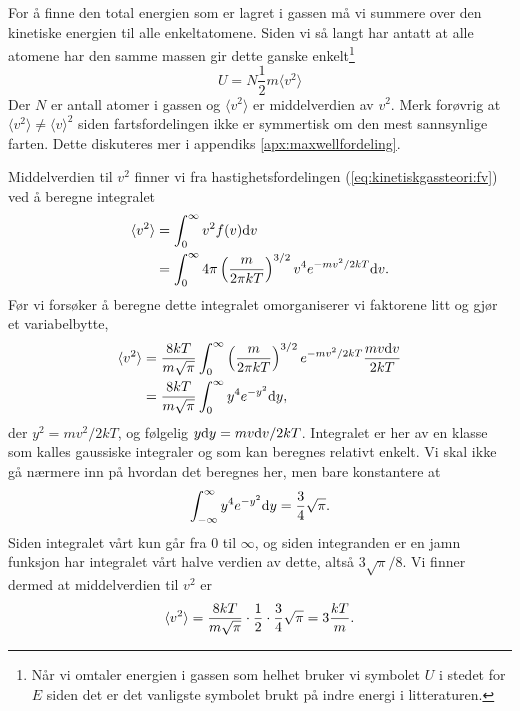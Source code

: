 For å finne den total energien som er lagret i gassen må vi summere over den kinetiske energien til alle enkeltatomene. Siden vi så langt har antatt at alle atomene har den samme massen gir dette ganske enkelt\footnote{Når vi omtaler energien i gassen som helhet bruker vi symbolet $U$ i stedet for $E$ siden det er det vanligste symbolet brukt på indre energi i litteraturen.}
\begin{displaymath}
	U = N\frac{1}{2}m\langle v^2 \rangle
\end{displaymath}
Der $N$ er antall atomer i gassen og $\langle v^2 \rangle$ er middelverdien av $v^2$. Merk forøvrig at $\langle v^2 \rangle \neq \langle v \rangle^2$ siden fartsfordelingen ikke er symmertisk om den mest sannsynlige farten. Dette diskuteres mer i appendiks \ref{apx:maxwellfordeling}.

Middelverdien til $v^2$ finner vi fra hastighetsfordelingen (\ref{eq:kinetiskgassteori:fv}) ved å beregne integralet
\begin{displaymath}
\begin{aligned}
	\langle v^2 \rangle &= \int_0^\infty v^2 f(v) \text{d} v \\
	&= \int_0^\infty 4\pi\left(\frac{m}{2\pi kT}\right)^{3/2} v^4 e^{-mv^2/2kT}\text{d} v.
\end{aligned}
\end{displaymath}
Før vi forsøker å beregne dette integralet omorganiserer vi faktorene litt og gjør et variabelbytte,
\begin{displaymath}
\begin{aligned}
	\langle v^2 \rangle &= \frac{8kT}{m\sqrt{\pi}} \int_0^\infty \left(\frac{m}{2\pi kT}\right)^{3/2}  e^{-mv^2/2kT}\frac{mv\text{d} v}{2kT} \\
	&=  \frac{8kT}{m\sqrt{\pi}} \int_0^\infty y^4 e^{-y^2} \text{d} y,
\end{aligned}
\end{displaymath}
der $y^2 = mv^2/2kT$, og følgelig $y\text{d} y = mv\text{d} v/2kT$. Integralet er her av en klasse som kalles gaussiske integraler og som kan beregnes relativt enkelt. Vi skal ikke gå nærmere inn på hvordan det beregnes her, men bare konstantere at
\begin{displaymath}
	\int_{-\infty}^\infty y^4e^{-y^2} \text{d} y = \frac{3}{4}\sqrt{\pi}.
\end{displaymath}
Siden integralet vårt kun går fra $0$ til $\infty$, og siden integranden er en jamn funksjon har integralet vårt halve verdien av dette, altså $3\sqrt{\pi}/8$. Vi finner dermed at middelverdien til $v^2$ er
\begin{displaymath}
	\langle v^2 \rangle = \frac{8kT}{m\sqrt{\pi}}\cdot\frac{1}{2}\cdot\frac{3}{4}\sqrt{\pi} = 3\frac{kT}{m}.
\end{displaymath}
